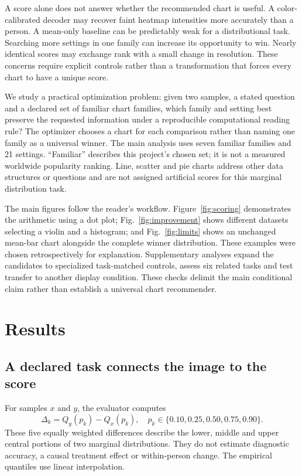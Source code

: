 \documentclass[11pt]{article}
\begin{document}
A score alone does not answer whether the recommended chart is useful. A color-calibrated decoder may recover faint heatmap intensities more accurately than a person. A mean-only baseline can be predictably weak for a distributional task. Searching more settings in one family can increase its opportunity to win. Nearly identical scores may exchange rank with a small change in resolution. These concerns require explicit controls rather than a transformation that forces every chart to have a unique score.

We study a practical optimization problem: given two samples, a stated question and a declared set of familiar chart families, which family and setting best preserve the requested information under a reproducible computational reading rule? The optimizer chooses a chart for each comparison rather than naming one family as a universal winner. The main analysis uses seven familiar families and 21 settings. ``Familiar'' describes this project's chosen set; it is not a measured worldwide popularity ranking. Line, scatter and pie charts address other data structures or questions and are not assigned artificial scores for this marginal distribution task.

The main figures follow the reader's workflow. Figure~\ref{fig:scoring} demonstrates the arithmetic using a dot plot; Fig.~\ref{fig:improvement} shows different datasets selecting a violin and a histogram; and Fig.~\ref{fig:limits} shows an unchanged mean-bar chart alongside the complete winner distribution. These examples were chosen retrospectively for explanation. Supplementary analyses expand the candidates to specialized task-matched controls, assess six related tasks and test transfer to another display condition. These checks delimit the main conditional claim rather than establish a universal chart recommender.

\section*{Results}
\subsection*{A declared task connects the image to the score}
For samples $x$ and $y$, the evaluator computes
\begin{equation}
\Delta_k=Q_y(p_k)-Q_x(p_k),\quad p_k\in\{0.10,0.25,0.50,0.75,0.90\}.
\label{eq:target}
\end{equation}
These five equally weighted differences describe the lower, middle and upper central portions of two marginal distributions. They do not estimate diagnostic accuracy, a causal treatment effect or within-person change. The empirical quantiles use linear interpolation.
\end{document}
